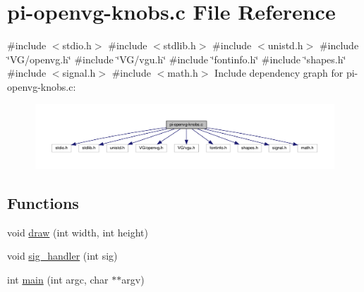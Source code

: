 \hypertarget{pi-openvg-knobs_8c}{}\section{pi-\/openvg-\/knobs.c File Reference}
\label{pi-openvg-knobs_8c}
{\ttfamily \#include $<$stdio.\+h$>$}\newline
{\ttfamily \#include $<$stdlib.\+h$>$}\newline
{\ttfamily \#include $<$unistd.\+h$>$}\newline
{\ttfamily \#include \char`\"{}V\+G/openvg.\+h\char`\"{}}\newline
{\ttfamily \#include \char`\"{}V\+G/vgu.\+h\char`\"{}}\newline
{\ttfamily \#include \char`\"{}fontinfo.\+h\char`\"{}}\newline
{\ttfamily \#include \char`\"{}shapes.\+h\char`\"{}}\newline
{\ttfamily \#include $<$signal.\+h$>$}\newline
{\ttfamily \#include $<$math.\+h$>$}\newline
Include dependency graph for pi-\/openvg-\/knobs.c\+:\nopagebreak
\begin{figure}[H]
\begin{center}
\leavevmode
\includegraphics[width=350pt]{pi-openvg-knobs_8c__incl}
\end{center}
\end{figure}
\subsection*{Functions}
\begin{DoxyCompactItemize}
\item 
void \hyperlink{pi-openvg-knobs_8c_a358d026c8b5c38a548bac21e2e279719}{draw} (int width, int height)
\item 
void \hyperlink{pi-openvg-knobs_8c_a5054c36923934387c6f7605dd1a2f3c9}{sig\+\_\+handler} (int sig)
\item 
int \hyperlink{pi-openvg-knobs_8c_a3c04138a5bfe5d72780bb7e82a18e627}{main} (int argc, char $\ast$$\ast$argv)
\end{DoxyCompactItemize}


